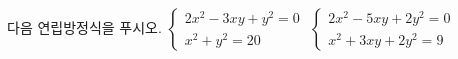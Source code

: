 다음 연립방정식을 푸시오.
 $\begin{cases} 2x^2-3xy+y^2=0 \\ x^2+y^2=20 \end{cases}$
 $\begin{cases} 2x^2-5xy+2y^2=0 \\ x^2+3xy+2y^2=9 \end{cases}$
